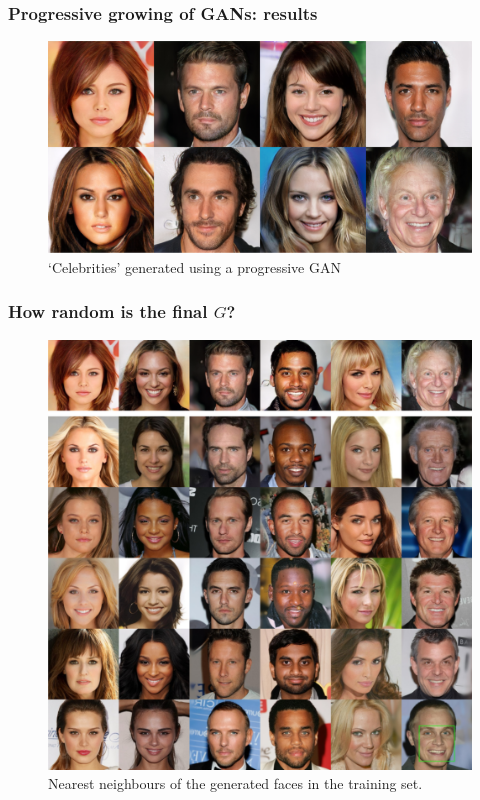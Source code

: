 \documentclass[xcolor=dvipsnames]{beamer}
\begin{document}
\begin{frame}
\frametitle{Progressive growing of GANs\cite{karras2017progressive}: results}
\begin{figure}
	\includegraphics[width=\linewidth]{img/prog_GANs_celebs.png}
	\caption{`Celebrities' generated using a progressive GAN}
\end{figure}
\end{frame}



\begin{frame}
\frametitle{How random is the final $G$?}
\begin{figure}
\includegraphics[width=0.7\linewidth]{img/prog_GAN_nn.png}
\caption{Nearest neighbours of the generated faces in the training set.}
\end{figure}
\end{frame}
\end{document}
